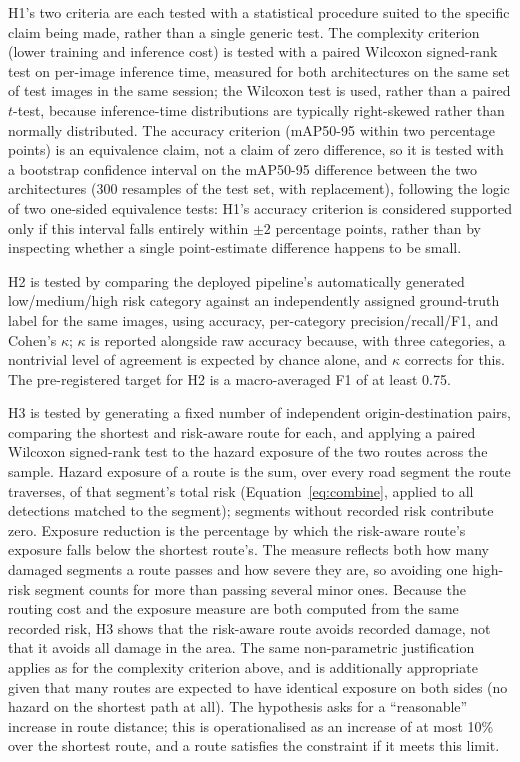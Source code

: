 \documentclass[10pt,a4paper,twocolumn]{article}
\begin{document}
H1's two criteria are each tested with a statistical procedure suited to
the specific claim being made, rather than a single generic test. The
complexity criterion (lower training and inference cost) is tested with
a paired Wilcoxon signed-rank test on per-image inference time, measured
for both architectures on the same set of test images in the same
session; the Wilcoxon test is used, rather than a paired $t$-test,
because inference-time distributions are typically right-skewed rather
than normally distributed. The accuracy criterion (mAP50-95 within two
percentage points) is an equivalence claim, not a claim of zero
difference, so it is tested with a bootstrap confidence interval on the
mAP50-95 difference between the two architectures (300 resamples of the
test set, with replacement), following the logic of two one-sided
equivalence tests: H1's accuracy criterion is considered supported only
if this interval falls entirely within $\pm 2$ percentage points, rather
than by inspecting whether a single point-estimate difference happens to
be small.

H2 is tested by comparing the deployed pipeline's automatically
generated low/medium/high risk category against an independently
assigned ground-truth label for the same images, using accuracy,
per-category precision/recall/F1, and Cohen's $\kappa$; $\kappa$ is
reported alongside raw accuracy because, with three categories, a
nontrivial level of agreement is expected by chance alone, and $\kappa$
corrects for this. The pre-registered target for H2 is a macro-averaged
F1 of at least 0.75.

H3 is tested by generating a fixed number of independent
origin-destination pairs, comparing the shortest and risk-aware route for
each, and applying a paired Wilcoxon signed-rank test to the hazard
exposure of the two routes across the sample. Hazard exposure of a route is
the sum, over every road segment the route traverses, of that segment's total
risk (Equation~\ref{eq:combine}, applied to all detections matched to the
segment); segments without recorded risk contribute zero. Exposure reduction
is the percentage by which the risk-aware route's exposure falls below the
shortest route's. The measure reflects both how many damaged segments a route
passes and how severe they are, so avoiding one high-risk segment counts for
more than passing several minor ones. Because the routing cost and the exposure
measure are both computed from the same recorded risk, H3 shows that the
risk-aware route avoids recorded damage, not that it avoids all damage in the
area. The same non-parametric
justification applies as for the complexity criterion above, and is
additionally appropriate given that many routes are expected to have
identical exposure on both sides (no hazard on the shortest path at all).
The hypothesis asks for a ``reasonable'' increase in route distance; this
is operationalised as an increase of at most 10\% over the shortest route,
and a route satisfies the constraint if it meets this limit.
\end{document}
